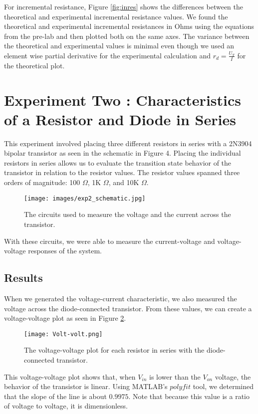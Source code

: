 \documentclass{article}
\begin{document}
For incremental resistance, Figure \ref{fig:inres} shows the differences between the theoretical and experimental incremental resistance values. We found the theoretical and experimental incremental resistances in Ohms using the equations from the pre-lab and then plotted both on the same axes.  The variance between the theoretical and experimental values is minimal even though we used an element wise partial derivative for the experimental calculation and $r_d = \frac{U_T}{I}$ for the theoretical plot.  

\section{Experiment Two : Characteristics of a Resistor and Diode in Series}
This experiment involved placing three different resistors in series with a 2N3904 bipolar transistor as seen in the schematic in Figure 4. Placing the individual resistors in series allows us to evaluate the transition state behavior of the transistor in relation to the resistor values.  The resistor values spanned three orders of magnitude: 100 $\Omega$, 1K $\Omega$, and 10K $\Omega$. 
\begin{figure}[H]   
  \centering        
  \texttt{[image: images/exp2\_schematic.jpg]}
  \caption{The circuits used to measure the voltage and the current across the transistor.}
  \label{fig:test4}
\end{figure}
With these circuits, we were able to measure the current-voltage and voltage-voltage responses of the system.

\subsection{Results}
When we generated the voltage-current characteristic, we also measured the voltage across the diode-connected transistor. From these values, we can create a voltage-voltage plot as seen in Figure \ref{fig:test5}.
\begin{figure}[H]   
  \centering        
  \texttt{[image: Volt-volt.png]}
  \caption{The voltage-voltage plot for each resistor in series with the diode-connected transistor.}
  \label{fig:test5}
\end{figure}
This voltage-voltage plot shows that, when $V_{in}$ is lower than the $V_{on}$ voltage, the behavior of the transistor is linear. Using MATLAB's $polyfit$ tool, we determined that the slope of the line is about $0.9975$. Note that because this value is a ratio of voltage to voltage, it is dimensionless.
\end{document}
